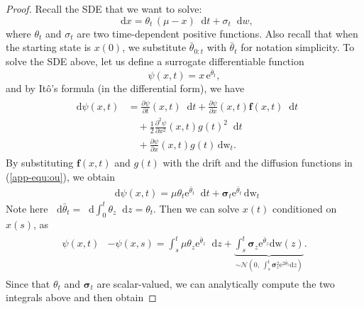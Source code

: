 \documentclass{article}
\newcommand{\diff}{\mathop{}\!\mathrm{d}}
\newcommand{\expp}{\mathrm{e}}
\theoremstyle{plain}
\theoremstyle{definition}
\theoremstyle{remark}
\begin{document}
\begin{proof}
Recall the SDE that we want to solve:
\begin{equation}
   \diff {x} = \theta_t \, (\mu - {x}) \diff t + \sigma_t \diff w,
\label{app-equ:ou}
\end{equation}
where $\theta_t$ and $\sigma_t$ are two time-dependent positive functions. Also recall that when the starting state is ${x}(0)$, we substitute $\bar{\theta}_{0:t}$ with $\bar{\theta}_{t}$ for notation simplicity. To solve the SDE above, let us define a surrogate differentiable function
\begin{equation}
    \psi({x}, t) = {x}\, \expp^{{\bar{{\theta}}_t}},
    \label{app-eq:function_phi}
\end{equation}
and by It\^{o}'s formula (in the differential form), we have
\begin{align}
\begin{split}
    \diff \psi({x}, t) 
    &= \frac{\partial \psi}{\partial t}({x}, t)\diff t + \frac{\partial \psi}{\partial {x}}({x}, t) {\mathbf f}({x}, t)\diff t   \\
    &\quad+ \frac{1}{2}\frac{\partial^2 \psi}{\partial {x}^2}({x}, t) g(t)^2 \diff t \\
    &\quad+ \frac{\partial \psi}{\partial {x}}({x}, t) g(t) \, \mathrm{dw}_t.
\end{split}
\label{app-eq:Ito_formula}
\end{align}
By substituting ${\mathbf f}({x}, t)$ and $g(t)$ with the drift and the diffusion functions in (\ref{app-equ:ou}), we obtain
\begin{align}
    \diff \psi({x}, t) = \mu {\theta}_t \expp^{\bar{{\theta}}_t}\diff t + \bm{\sigma}_t \expp^{\bar{{\theta}}_t} \, \mathrm{dw}_t 
    \label{eq:solution_phi}
\end{align}
Note here $\diff{\bar{{\theta}}_t} = \diff \int^t_0 \theta_z \diff z = {\theta}_t$. 
Then we can solve ${x}(t)$ conditioned on ${x}(s)$, as
\begin{align}
\begin{split}
    \psi({x}, t) &- \psi({x}, s) = \int_{s}^t \mu {\theta}_z \expp^{\bar{{\theta}}_z}\diff z + \underbrace{\int_{s}^t\bm{\sigma}_z \expp^{\bar{{\theta}}_z}{\mathrm{dw}(z)}}_{\sim \mathcal{N}\left(0, \ \int_{s}^t\bm{\sigma}_z^2 \expp^{2\bar{{\theta}}_z}{\mathrm{d}z}\right)}.
    \label{eq:integral_xt_x0}
\end{split}
\end{align}
Since that ${{\theta}_t}$ and $\bm{\sigma}_t$ are scalar-valued, we can analytically compute the two integrals above and then obtain

\end{proof}
\end{document}
